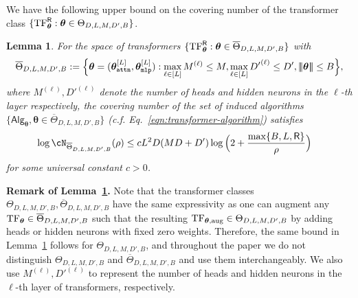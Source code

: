 \documentclass[10pt]{article}
\newtheorem{lemma}[theorem]{Lemma}
\renewcommand{\bar}{\overline}
\newcommand{\<}{\left\langle}
\renewcommand{\>}{\right\rangle}
\newcommand{\lth}{{(\ell)}}
\newcommand{\TF}{{\rm TF}}
\newcommand{\nrmp}[1]{{\left|\!\left|\!\left|{#1}\right|\!\right|\!\right|}}
\newcommand{\mlp}{{\tt mlp}}
\newcommand{\attn}{{\tt attn}}
\newcommand{\sAlg}{{\mathsf{Alg}}}
\newcommand{\tfpar}{{\btheta}}
\newcommand{\tfparspace}{{\Theta}}
\newcommand{\layer}{{L}}
\newcommand{\hidden}{{D'}}
\newcommand{\head}{{M}}
\newcommand{\normb}{{B}}
\newcommand{\clipval}{{\mathsf{R}}}
\newcommand{\embd}{{D}}
\def\btheta{{\boldsymbol \theta}}
\begin{document}
We have the following upper bound on the covering number of the transformer class $\{\TF^\clipval_{\tfpar}:\tfpar\in\tfparspace_{D, \layer,\head,\hidden,\normb}\}$.
\begin{lemma}\label{lm:cover_num_bound}
For the space of transformers $\{\TF^\clipval_{\tfpar}:\tfpar\in\bar{\tfparspace}_{D, \layer,\head,\hidden,\normb}\}$ with
\begin{align*}
\bar{\tfparspace}_{D, \layer,\head,\hidden,\normb}:= \Big\{\tfpar=(\tfpar^{[\layer]}_\attn,\tfpar^{[\layer]}_\mlp):\max_{\ell\in[\layer]}\head^\lth\leq \head, \max_{\ell\in[\layer]}\hidden^\lth\leq \hidden, \nrmp{\tfpar}\leq\normb \Big\},
\end{align*}where $\head^\lth,\hidden^\lth$ denote the number  of heads and hidden neurons in the $\ell$-th layer respectively, the covering number of the set of induced algorithms $\{\sAlg_\tfpar,\tfpar\in\bar{\tfparspace}_{D, \layer,\head,\hidden,\normb}\}$ (c.f. Eq.~\ref{eqn:transformer-algorithm}) satisfies
\begin{align*}
    \log \cN_{\bar{\tfparspace}_{D, \layer,\head,\hidden,\normb}}(\rho)
    &\leq c\layer^2\embd(\head\embd+\hidden)\log\Big(2+\frac{\max\{\normb,\layer,\clipval\}}{\rho}\Big)
\end{align*} for some universal constant $c>0$.
\end{lemma}
\textbf{Remark of Lemma~\ref{lm:cover_num_bound}.} Note that the transformer classes ${\tfparspace}_{D, \layer,\head,\hidden,\normb},\bar{\tfparspace}_{D, \layer,\head,\hidden,\normb}$ have the same expressivity as one can augment any $\TF_\tfpar\in \bar{\tfparspace}_{D, \layer,\head,\hidden,\normb}$ such that the resulting $\TF_{\tfpar,\mathrm{aug}}\in{\tfparspace}_{D, \layer,\head,\hidden,\normb}$ by adding heads or hidden neurons with fixed zero weights. Therefore, the same bound in Lemma~\ref{lm:cover_num_bound} follows for ${\tfparspace}_{D, \layer,\head,\hidden,\normb}$, and  throughout the paper we do not distinguish ${\tfparspace}_{D, \layer,\head,\hidden,\normb}$ and $\bar{\tfparspace}_{D, \layer,\head,\hidden,\normb}$ and use them interchangeably. We also use $\head^\lth,\hidden^\lth$ to  represent the number  of heads and hidden neurons in the $\ell$-th layer of transformers, respectively.
\end{document}
